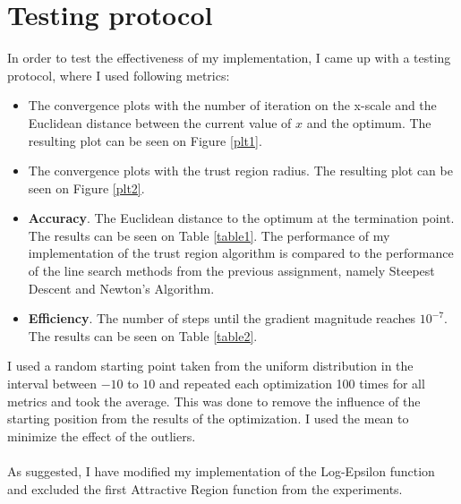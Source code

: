 \documentclass[a4paper]{article}
\begin{document}
\section{Testing protocol}
In order to test the effectiveness of my implementation, I came up with a
testing protocol, where I used following metrics:
\begin{itemize}
\item The convergence plots with the number of iteration on the x-scale and the
  Euclidean distance between the current value of $x$ and the
  optimum. The resulting plot can be seen on Figure \ref{plt1}.
\item The convergence plots with the trust region radius.
  The resulting plot can be seen on Figure \ref{plt2}. 
\item \textbf{Accuracy}. The Euclidean distance to the optimum at the
  termination point. The results can be seen on Table \ref{table1}.
  The performance of my implementation of the trust
  region algorithm is compared to the performance of the line search methods
  from the previous assignment, namely Steepest Descent and Newton's Algorithm.
\item \textbf{Efficiency}. The number of steps until the gradient
  magnitude reaches $10^{-7}$. The results can be seen on Table \ref{table2}.
\end{itemize}
I used a random starting point taken from the uniform distribution in the
interval between $-10$ to $10$ and repeated each optimization 100 times for all
metrics and took the average. This was done to remove the influence of the
starting position from the results of the optimization. I used the mean 
to minimize the effect of the outliers. \\\\
As suggested, I have modified my implementation of the Log-Epsilon function and
excluded the first Attractive Region function from the experiments.
\end{document}
